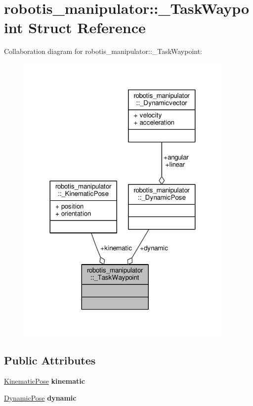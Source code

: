 \hypertarget{structrobotis__manipulator_1_1___task_waypoint}{}\section{robotis\+\_\+manipulator\+:\+:\+\_\+\+Task\+Waypoint Struct Reference}
\label{structrobotis__manipulator_1_1___task_waypoint}


Collaboration diagram for robotis\+\_\+manipulator\+:\+:\+\_\+\+Task\+Waypoint\+:
\nopagebreak
\begin{figure}[H]
\begin{center}
\leavevmode
\includegraphics[width=300pt]{structrobotis__manipulator_1_1___task_waypoint__coll__graph}
\end{center}
\end{figure}
\subsection*{Public Attributes}
\begin{DoxyCompactItemize}
\item 
\hyperlink{structrobotis__manipulator_1_1___kinematic_pose}{Kinematic\+Pose} {\bfseries kinematic}\hypertarget{structrobotis__manipulator_1_1___task_waypoint_a620c82a43f4573e9cdd88e40824d1c2c}{}\label{structrobotis__manipulator_1_1___task_waypoint_a620c82a43f4573e9cdd88e40824d1c2c}

\item 
\hyperlink{structrobotis__manipulator_1_1___dynamic_pose}{Dynamic\+Pose} {\bfseries dynamic}\hypertarget{structrobotis__manipulator_1_1___task_waypoint_a0a3efe2321c04b2dc0018ac3a3d6c925}{}\label{structrobotis__manipulator_1_1___task_waypoint_a0a3efe2321c04b2dc0018ac3a3d6c925}

\end{DoxyCompactItemize}



